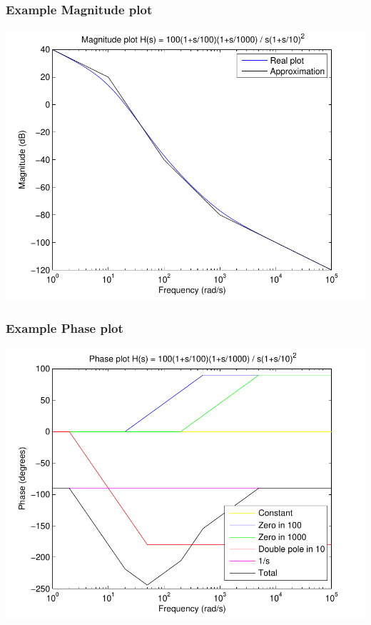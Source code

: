 \begin{frame}
\frametitle{Example Magnitude plot}

\begin{center}
\includegraphics[scale=0.5]{MagnitudeApprox}
\end{center}


\end{frame}

\begin{frame}
\frametitle{Example Phase plot}

\begin{center}
\includegraphics[scale=0.5]{PhaseParts}
\end{center}


\end{frame}


